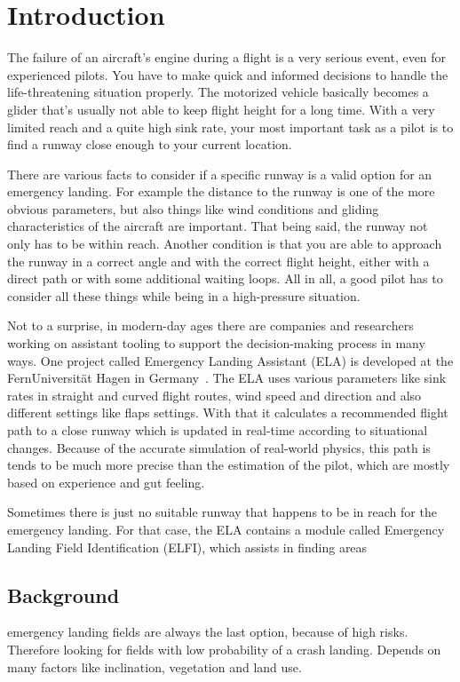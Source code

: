 \section{Introduction}
The failure of an aircraft's engine during a flight is a very serious event, even for experienced pilots. You have to make quick and informed decisions to handle the life-threatening situation properly. The motorized vehicle basically becomes a glider that's usually not able to keep flight height for a long time. With a very limited reach and a quite high sink rate, your most important task as a pilot is to find a runway close enough to your current location.

There are various facts to consider if a specific runway is a valid option for an emergency landing. For example the distance to the runway is one of the more obvious parameters, but also things like wind conditions and gliding characteristics of the aircraft are important. That being said, the runway not only has to be within reach. Another condition is that you are able to approach the runway in a correct angle and with the correct flight height, either with a direct path or with some additional waiting loops. All in all, a good pilot has to consider all these things while being in a high-pressure situation.

Not to a surprise, in modern-day ages there are companies and researchers working on assistant tooling to support the decision-making process in many ways. One project called Emergency Landing Assistant (ELA) is developed at the FernUniversität Hagen in Germany~\cite{feu_fas}. The ELA uses various parameters like sink rates in straight and curved flight routes, wind speed and direction and also different settings like flaps settings. With that it calculates a recommended flight path to a close runway which is updated in real-time according to situational changes. Because of the accurate simulation of real-world physics, this path is tends to be much more precise than the estimation of the pilot, which are mostly based on experience and gut feeling.

Sometimes there is just no suitable runway that happens to be in reach for the emergency landing. For that case, the ELA contains a module called Emergency Landing Field Identification (ELFI), which assists in finding areas

\subsection{Background}
\cite{feu_elfi}
emergency landing fields are always the last option, because of high risks. Therefore looking for fields with low probability of a crash landing. Depends on many factors like inclination, vegetation and land use.

